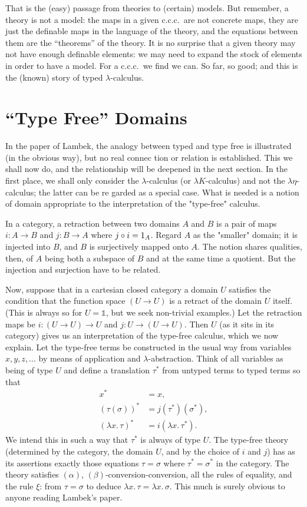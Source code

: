 \documentclass[12pt]{article}
\def\to{\rightarrow}
\def\id{{\textrm 1}}
\def\comp{\circ}
\def\bbone{\mathbb 1}
\def\ccc{{c.c.c.}}
\def\l{\lambda}
\def\lm#1.#2{\lambda#1.\, #2}
\def\U{U}
\begin{document}
That is the (easy) passage from theories to (certain) models.
But remember, a theory is not a model: the maps in a given
\ccc\ are not concrete maps, they are just the definable maps in the language of the theory, and the equations between them are the ``theorems'' of the theory. It is no surprise that a given theory may not have enough definable elements: we may need to expand the stock of elements in order to have a model. For a \ccc\ we find we can. So far, so good; and this is the (known) story of typed $\l$-calculus.

\section{``Type Free'' Domains}

In the paper of Lambek, the analogy between typed and type free is illustrated (in the obvious way), but no real connec tion or relation is established. This we shall now do, and the relationship will be deepened in the next section.
In the first place, we shall only consider the $\l$-calculus (or $\l K$-calculus) and not the $\l \eta$-calculus; the latter can be re garded as a special case. What is needed is a notion of domain appropriate to the interpretation of the "type-free" calculus.

In a category, a retraction between two domains $A$ and $B$ is a pair of maps $i: A	\to B$ and $j : B \to A$ where $j \comp i = \id_A$. Regard $A$ as the "smaller" domain; it is injected into $B$, and $B$ is surjectively mapped onto $A$. The notion shares qualities, then, of $A$ being both a subspace of $B$ and at the same time a quotient.
But the injection and surjection have to be related.

Now, suppose that in a cartesian closed category a domain $\U$ satisfies the condition that the function space $(\U\to \U)$ is a retract of the domain $\U$ itself. (This is always so for $\U = \bbone$, but we seek non-trivial examples.) Let the retraction maps be $i: (\U \to \U) \to \U$ and $j : \U \to (\U \to \U)$. Then $\U$ (as it sits in its category) gives us an interpretation of the type-free calculus, which we now explain.
Let the type-free terms be constructed in the usual way from variables $x,y,z, \dots$ by means of application and $\l$-abstraction.
Think of all variables as being of type $\U$ and define a translation $\tau^*$ from untyped terms to typed terms so that
\begin{align*}
x^* &= x, \\
(\tau(\sigma))^* &= j(\tau^*)(\sigma^*),\\
(\lm{x}.\tau)^* &= i(\lm{x}.\tau^*).
\end{align*}
We intend this in such a way that $\tau^*$ is always of type $\U$. The type-free theory (determined by the category, the domain $\U$, and by the choice of $i$ and $j$) has as its assertions exactly those equations $\tau = \sigma$ where $\tau^* = \sigma^*$ in the category. The theory satisfies $(\alpha)$, $(\beta)$-conversion-conversion, all the rules of equality, and the rule $\xi$: from $\tau = \sigma$ to deduce $\l x .\, \tau = \l x .\, \sigma$. This much is surely obvious to anyone reading Lambek's paper.
\end{document}
